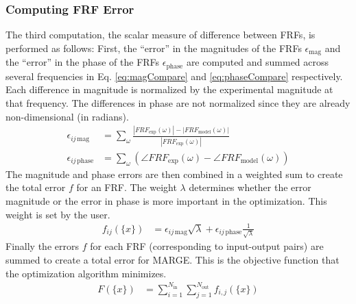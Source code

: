 \subsubsection{Computing FRF Error} %

The third computation, the scalar measure of difference between FRFs, is performed as follows:
First, the ``error'' in the magnitudes of the FRFs $\epsilon_\text{mag}$ and the ``error'' in the phase of the FRFs $\epsilon_\text{phase}$ are computed and summed across several frequencies in Eq. \ref{eq:magCompare} and \ref{eq:phaseCompare} respectively. Each difference in magnitude is normalized by the experimental magnitude at that frequency. The differences in phase are not normalized since they are already non-dimensional (in radians).
\begin{align}
	\label{eq:magCompare}
	\epsilon_{ij \, \text{mag}} &= \sum_\omega \frac{|FRF_\text{exp} (\omega)| - |FRF_\text{model} (\omega)|}{|FRF_\text{exp} (\omega)|} \\
	\label{eq:phaseCompare}
	\epsilon_{ij \, \text{phase}} &= \sum_\omega \left( \angle FRF_\text{exp} (\omega) - \angle FRF_\text{model} (\omega) \right)
\end{align}
The magnitude and phase errors are then combined in a weighted sum to create the total error $f$ for an FRF. The weight $\lambda$ determines whether the error magnitude or the error in phase is more important in the optimization. This weight is set by the user.
\begin{align}
	f_{ij}(\{x\}) &= \epsilon_{ij \, \text{mag}} \sqrt{\lambda} + \epsilon_{ij \, \text{phase}} \frac{1}{\sqrt{\lambda}}
\end{align}
Finally the errors $f$ for each FRF (corresponding to input-output pairs) are summed to create a total error for MARGE. This is the objective function that the optimization algorithm minimizes.
\begin{align}
	F(\{x\}) &= \sum_{i=1}^{N_\text{in}} \sum_{j=1}^{N_\text{out}} f_{i,j}(\{x\})
\end{align}

